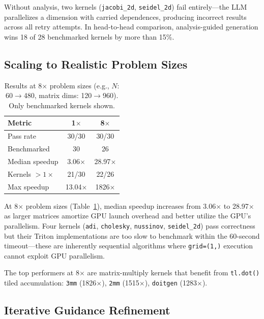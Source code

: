 \documentclass[sigconf]{acmart}
\begin{document}
Without analysis, two kernels (\texttt{jacobi\_2d},
\texttt{seidel\_2d}) fail entirely---the LLM parallelizes a dimension
with carried dependences, producing incorrect results across all
retry attempts.  In head-to-head comparison, analysis-guided generation
wins 18 of 28 benchmarked kernels by more than 15\%.

\subsection{Scaling to Realistic Problem Sizes}

\begin{table}[t]
  \caption{Results at 8$\times$ problem sizes (e.g., $N$: 60$\to$480,
    matrix dims: 120$\to$960).  Only benchmarked kernels shown.}
  \label{tab:results_8x}
  \centering\small
  \begin{tabular}{lcc}
    \toprule
    \textbf{Metric} & \textbf{1$\times$} & \textbf{8$\times$} \\
    \midrule
    Pass rate          & 30/30     & 30/30     \\
    Benchmarked        & 30        & 26        \\
    Median speedup     & 3.06$\times$ & 28.97$\times$ \\
    Kernels $>1\times$ & 21/30     & 22/26     \\
    Max speedup        & 13.04$\times$ & 1826$\times$ \\
    \bottomrule
  \end{tabular}
\end{table}

At 8$\times$ problem sizes (Table~\ref{tab:results_8x}), median speedup
increases from 3.06$\times$ to 28.97$\times$ as larger matrices
amortize GPU launch overhead and better utilize the GPU's parallelism.
Four kernels (\texttt{adi}, \texttt{cholesky}, \texttt{nussinov},
\texttt{seidel\_2d}) pass correctness but their Triton implementations
are too slow to benchmark within the 60-second timeout---these are
inherently sequential algorithms where \texttt{grid=(1,)} execution
cannot exploit GPU parallelism.

The top performers at 8$\times$ are matrix-multiply kernels that
benefit from \texttt{tl.dot()} tiled accumulation:
\texttt{3mm} (1826$\times$), \texttt{2mm} (1515$\times$),
\texttt{doitgen} (1283$\times$).


\subsection{Iterative Guidance Refinement}
\end{document}
